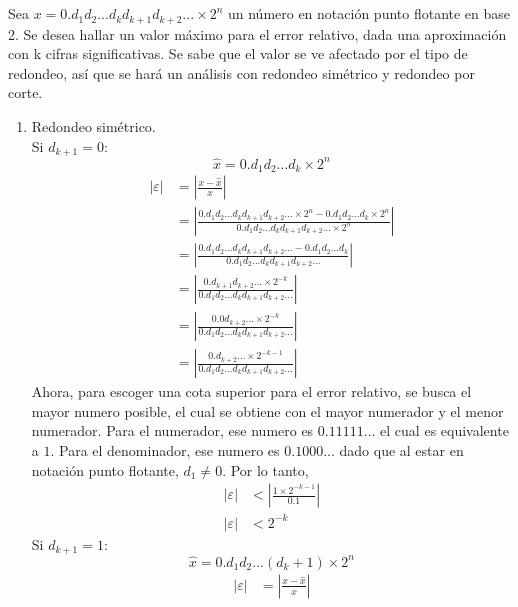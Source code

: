 \maketitle
\section{}
Sea $x=0.d_1d_2...d_kd_{k+1}d_{k+2}...\times2^n$ un número en notación punto flotante en base 2. Se desea hallar un valor máximo para el error relativo, dada una aproximación con k cifras significativas. Se sabe que el valor se ve afectado por el tipo de redondeo, así que se hará un análisis con redondeo simétrico y redondeo por corte.
\begin{enumerate}
    \item Redondeo simétrico.\\Si $d_{k+1} = 0$:\\
$$\hat{x}=0.d_1d_2...d_k\times2^n$$
\begin{align*}
|\varepsilon| &= \left|\frac{x - \hat{x}}{x}\right|\\
&= \left|\frac{0.d_1d_2...d_kd_{k+1}d_{k+2}...\times2^n - 0.d_1d_2...d_k\times2^n}{0.d_1d_2...d_kd_{k+1}d_{k+2}...\times2^n}\right|\\
&= \left|\frac{0.d_1d_2...d_kd_{k+1}d_{k+2}... - 0.d_1d_2...d_k}{0.d_1d_2...d_kd_{k+1}d_{k+2}...} \right|\\
&=\left| \frac{0.d_{k+1}d_{k+2}...\times2^{-k}}{0.d_1d_2...d_kd_{k+1}d_{k+2}...} \right|\\
&=\left| \frac{0.0d_{k+2}...\times2^{-k}}{0.d_1d_2...d_kd_{k+1}d_{k+2}...} \right|\\
&=\left| \frac{0.d_{k+2}...\times2^{-k-1}}{0.d_1d_2...d_kd_{k+1}d_{k+2}...} \right|
\end{align*}
Ahora, para escoger una cota superior para el error relativo, se busca el mayor numero posible, el cual se obtiene con el mayor numerador y el menor numerador. Para el numerador, ese numero es $0.11111...$ el cual es equivalente a $1$. Para el denominador, ese numero es $0.1000...$ dado que al estar en notación punto flotante, $d_1\neq0$. Por lo tanto,
\begin{align*}
    |\varepsilon| &< \left| \frac{1\times2^{-k-1}}{0.1} \right|\\
    |\varepsilon| &< 2^{-k}
\end{align*}
Si $d_{k+1} = 1$:
$$ \hat{x} = 0.d_1d_2...(d_k+1)\times2^n$$
\begin{align*}
|\varepsilon| &= \left|\frac{x - \hat{x}}{x}\right|\\

\end{align*}
\end{enumerate}
